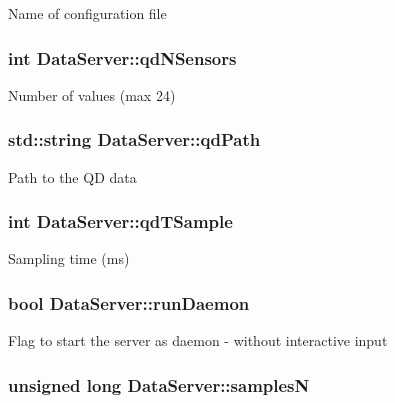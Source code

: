 Name of configuration file \hypertarget{classDataServer_a61cfe7444488df95ed8a89bbb34823a1}{
\subsubsection[{qd\-N\-Sensors}]{\setlength{\rightskip}{0pt plus 5cm}int Data\-Server\-::qd\-N\-Sensors\hspace{0.3cm}{\ttfamily [private]}}}\label{classDataServer_a61cfe7444488df95ed8a89bbb34823a1}
Number of values (max 24) \hypertarget{classDataServer_adbd30fd13ec1fec779c48b942446f205}{
\subsubsection[{qd\-Path}]{\setlength{\rightskip}{0pt plus 5cm}std\-::string Data\-Server\-::qd\-Path\hspace{0.3cm}{\ttfamily [private]}}}\label{classDataServer_adbd30fd13ec1fec779c48b942446f205}
Path to the Q\-D data \hypertarget{classDataServer_a69f0486314e244364a297310559446d7}{
\subsubsection[{qd\-T\-Sample}]{\setlength{\rightskip}{0pt plus 5cm}int Data\-Server\-::qd\-T\-Sample\hspace{0.3cm}{\ttfamily [private]}}}\label{classDataServer_a69f0486314e244364a297310559446d7}
Sampling time (ms) \hypertarget{classDataServer_a6dec7e960603680e4114abc5b91a8457}{
\subsubsection[{run\-Daemon}]{\setlength{\rightskip}{0pt plus 5cm}bool Data\-Server\-::run\-Daemon\hspace{0.3cm}{\ttfamily [private]}}}\label{classDataServer_a6dec7e960603680e4114abc5b91a8457}
Flag to start the server as daemon -\/ without interactive input \hypertarget{classDataServer_a607273a35cc1cd03b19d548503ad7831}{
\subsubsection[{samples\-N}]{\setlength{\rightskip}{0pt plus 5cm}unsigned long Data\-Server\-::samples\-N\hspace{0.3cm}{\ttfamily [private]}}}\label{classDataServer_a607273a35cc1cd03b19d548503ad7831}
